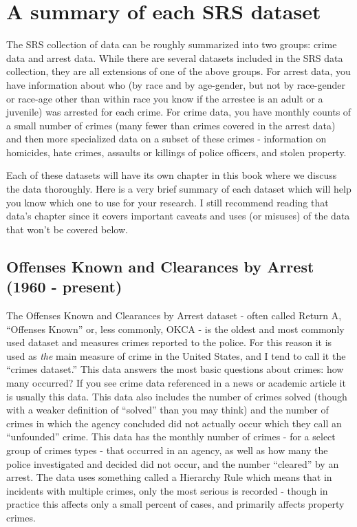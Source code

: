 \documentclass[
  12pt,
  openany]{book}
\begin{document}
\section{A summary of each SRS dataset}\label{a-summary-of-each-srs-dataset}

The SRS collection of data can be roughly summarized into two groups: crime data and arrest data. While there are several datasets included in the SRS data collection, they are all extensions of one of the above groups. For arrest data, you have information about who (by race and by age-gender, but not by race-gender or race-age other than within race you know if the arrestee is an adult or a juvenile) was arrested for each crime. For crime data, you have monthly counts of a small number of crimes (many fewer than crimes covered in the arrest data) and then more specialized data on a subset of these crimes - information on homicides, hate crimes, assaults or killings of police officers, and stolen property.

Each of these datasets will have its own chapter in this book where we discuss the data thoroughly. Here is a very brief summary of each dataset which will help you know which one to use for your research. I still recommend reading that data's chapter since it covers important caveats and uses (or misuses) of the data that won't be covered below.

\subsection{Offenses Known and Clearances by Arrest (1960 - present)}\label{offenses-known-and-clearances-by-arrest-1960---present}

The Offenses Known and Clearances by Arrest dataset - often called Return A, ``Offenses Known'' or, less commonly, OKCA - is the oldest and most commonly used dataset and measures crimes reported to the police. For this reason it is used as \emph{the} main measure of crime in the United States, and I tend to call it the ``crimes dataset.'' This data answers the most basic questions about crimes: how many occurred? If you see crime data referenced in a news or academic article it is usually this data. This data also includes the number of crimes solved (though with a weaker definition of ``solved'' than you may think) and the number of crimes in which the agency concluded did not actually occur which they call an ``unfounded'' crime. This data has the monthly number of crimes - for a select group of crimes types - that occurred in an agency, as well as how many the police investigated and decided did not occur, and the number ``cleared'' by an arrest. The data uses something called a Hierarchy Rule which means that in incidents with multiple crimes, only the most serious is recorded - though in practice this affects only a small percent of cases, and primarily affects property crimes.
\end{document}
